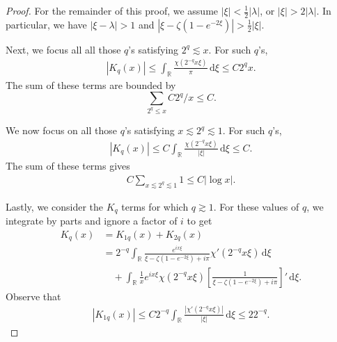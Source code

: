 \documentclass[../dissertation.tex]{subfiles}
\begin{document}
\begin{proof}
	For the remainder of this proof, we assume $\displaystyle |\xi| < \frac{1}{2} |\lambda|$, 
	or $|\xi| > 2 |\lambda|$. In particular, we have $|\xi - \lambda| > 1$ and
	$\displaystyle \left|\xi - \zeta\left(1 - e^{-2\xi}\right)\right| > \frac{1}{2}|\xi|$.

	Next, we focus all all those $q$'s satisfying $2^{q} \lesssim x$. For such $q$'s,
	\begin{align}
		\left| K_q(x) \right| 
			\leq \int_{\mathbb R} \frac{\chi\left(2^{-q} x \xi\right)}{\pi} \, \mathrm{d}\xi
			\leq C 2^q x.
	\end{align}
	The sum of these terms are bounded by 
	\[
		\sum_{2^q \leq x} C 2^q / x \leq C.
	\]

	We now focus on all those $q$'s satisfying $x \lesssim 2^q \lesssim 1$. For such $q$'s,
	\begin{align}
		\left| K_q(x) \right| 
			\leq C \int_{\mathbb R} \frac{\chi\left(2^{-q} x \xi\right)}{|\xi|} \, \mathrm{d}\xi
			\leq C.
	\end{align}
	The sum of these terms gives 
	\begin{align}
		C \sum_{x \lesssim 2^q \lesssim 1} 1 
			\leq C |\log x|.
	\end{align}

	Lastly, we consider the $K_q$ terms for which $q \gtrsim 1$. For these values of $q$, 
	we integrate by parts and ignore a factor of $i$ to get
	\begin{align*}
		K_q(x)
			&= K_{1q}(x) + K_{2q}(x) \\
			&= 2^{-q} 
				\int_{\mathbb R} 
					\frac{e^{i x \xi}}{\xi - \zeta(1 - e^{-2\xi}) + i\pi} \chi'(2^{-q}x\xi)
				\, \mathrm{d}\xi \\
			&\quad +
				\int_{\mathbb R}
					\frac{1}{x} e^{ix\xi} \chi\left(2^{-q} x \xi\right)
						\left[ \frac{1}{\xi - \zeta(1 - e^{-2\xi}) + i\pi} \right]'
					\, \mathrm{d}\xi.
	\end{align*}
	Observe that
	\begin{align}\label{eq:1.04-smallz-7}
		|K_{1q}(x)|
			\leq C 2^{-q} \int_{\mathbb R} \frac{|\chi'(2^{-q}x\xi)|}{|\xi|} \, \mathrm{d}\xi
			\leq 2 2^{-q}.
	\end{align}


\end{proof}
\end{document}
